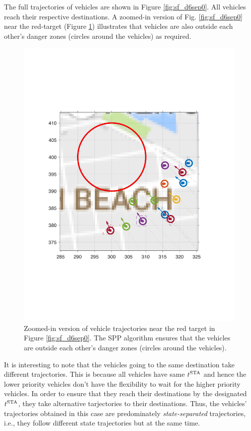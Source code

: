 The full trajectories of vehicles are shown in Figure \ref{fig:sf_d6sep0}. All vehicles reach their respective destinations. A zoomed-in version of Fig. \ref{fig:sf_d6sep0} near the red-target (Figure \ref{fig:sf_d6sep0_zoomed}) illustrates that vehicles are also outside each other's danger zones (circles around the vehicles) as required. 
%
\begin{figure}[h]
  \centering
  \includegraphics[width=\columnwidth]{"figs/sf_d6sep0_zoomed"}
  \caption{Zoomed-in version of vehicle trajectories near the red target in Figure \ref{fig:sf_d6sep0}. The SPP algorithm ensures that the vehicles are outside each other's danger zones (circles around the vehicles).} 
  \label{fig:sf_d6sep0_zoomed}
\end{figure}
It is interesting to note that the vehicles going to the same destination take different trajectories. This is because all vehicles have same $t^\text{STA}$ and hence the lower priority vehicles don't have the flexibility to wait for the higher priority vehicles. In order to ensure that they reach their destinations by the designated $t^\text{STA}$, they take alternative tarjectories to their destinations. Thus, the vehicles' trajectories obtained in this case are predominately \textit{state-separated} trajectories, i.e., they follow different state trajectories but at the same time. 

